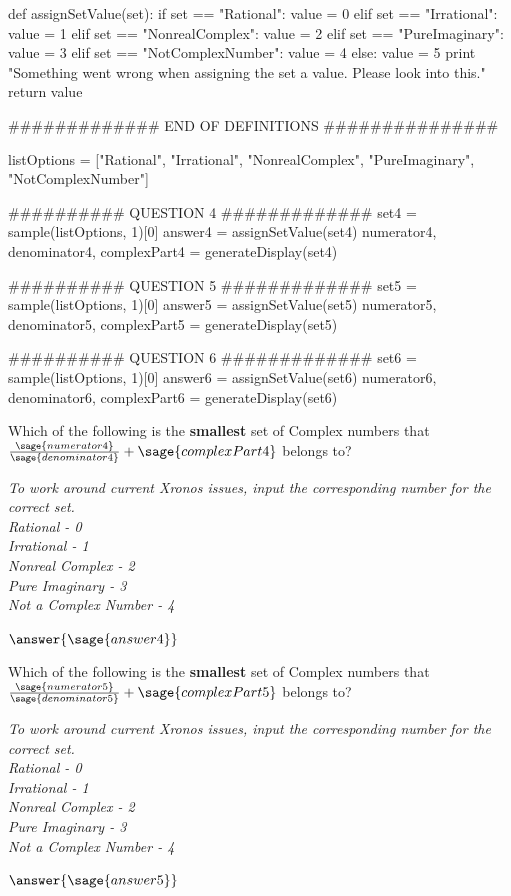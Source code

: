 \documentclass{ximera}
\begin{document}
\begin{sagesilent}
def assignSetValue(set):
    if set == "Rational":
        value = 0
    elif set == "Irrational":
        value = 1 
    elif set == "NonrealComplex":
        value = 2
    elif set == "PureImaginary":
        value = 3
    elif set == "NotComplexNumber":
        value = 4
    else:
        value = 5
        print "Something went wrong when assigning the set a value. Please look into this."
    return value

############# END OF DEFINITIONS ###############

listOptions = ["Rational", "Irrational", "NonrealComplex", "PureImaginary", "NotComplexNumber"]

########## QUESTION 4 #############
set4 = sample(listOptions, 1)[0]
answer4 = assignSetValue(set4)
numerator4, denominator4, complexPart4 = generateDisplay(set4)

########## QUESTION 5 #############
set5 = sample(listOptions, 1)[0]
answer5 = assignSetValue(set5)
numerator5, denominator5, complexPart5 = generateDisplay(set5)

########## QUESTION 6 #############
set6 = sample(listOptions, 1)[0]
answer6 = assignSetValue(set6)
numerator6, denominator6, complexPart6 = generateDisplay(set6)
\end{sagesilent}

\begin{question}
Which of the following is the \textbf{smallest} set of Complex numbers that $\frac{\sage{numerator4}}{\sage{denominator4}} + \sage{complexPart4} $ belongs to?

\textit{To work around current Xronos issues, input the corresponding number for the correct set. \\
Rational - 0 \\
Irrational - 1 \\
Nonreal Complex - 2 \\
Pure Imaginary - 3 \\
Not a Complex Number - 4 
}

$\answer{\sage{answer4}}$

\end{question}

\begin{question}
Which of the following is the \textbf{smallest} set of Complex numbers that $\frac{\sage{numerator5}}{\sage{denominator5}} + \sage{complexPart5} $ belongs to?
	
\textit{To work around current Xronos issues, input the corresponding number for the correct set. \\
Rational - 0 \\
Irrational - 1 \\
Nonreal Complex - 2 \\
Pure Imaginary - 3 \\
Not a Complex Number - 4 
}
	
$\answer{\sage{answer5}}$
	
\end{question}
\end{document}
